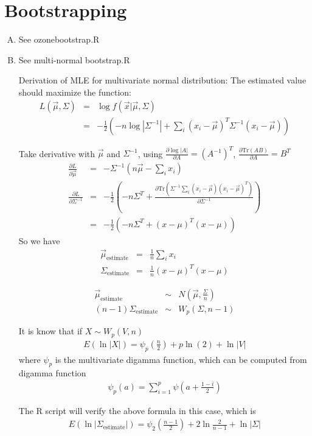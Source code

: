 \documentclass{article}
\begin{document}
\section{Bootstrapping}
\begin{enumerate}[(A)]
\item
See ozonebootstrap.R

\item
See multi-normal bootstrap.R

Derivation of MLE for multivariate normal distribution: The estimated value should maximize the function:
\begin{eqnarray}
L(\vec{\mu},\Sigma)&=&\log f(\vec{x}|\vec{\mu},\Sigma)\nonumber\\
&=&-\frac{1}{2}(-n\log|\Sigma^{-1}|+\sum_i(x_i-\vec{\mu})^T\Sigma^{-1}(x_i-\vec{\mu}))
\end{eqnarray}

Take derivative with $\vec{\mu}$ and $\Sigma^{-1}$, using $\frac{\partial\log|A|}{\partial A}=(A^{-1})^T$, $\frac{\partial\textrm{Tr}(AB)}{\partial A}=B^T$
\begin{eqnarray}
\frac{\partial L}{\partial\vec{\mu}}&=&-\Sigma^{-1}(n\vec{\mu}-\sum_ix_i)\\
\frac{\partial L}{\partial\Sigma^{-1}}&=&-\frac{1}{2}(-n\Sigma^T+\frac{\partial\textrm{Tr}(\Sigma^{-1}\sum_i(x_i-\vec{\mu})(x_i-\vec{\mu})^T)}{\partial\Sigma^{-1}})\nonumber\\
&=&-\frac{1}{2}(-n\Sigma^T+(x-\mu)^T(x-\mu))
\end{eqnarray}
So we have
\begin{eqnarray}
\vec{\mu}_{\textrm{estimate}}&=&\frac{1}{n}\sum_ix_i\\
\Sigma_{\textrm{estimate}}&=&\frac{1}{n}(x-\mu)^T(x-\mu)
\end{eqnarray}

\begin{eqnarray}
\vec{\mu}_{\textrm{estimate}}&\sim&N(\vec{\mu},\frac{\Sigma}{n})\\
(n-1)\Sigma_{\textrm{estimate}}&\sim&W_p(\Sigma,n-1)
\end{eqnarray}

It is know that if $X\sim W_p(V,n)$
\begin{eqnarray}
E(\ln|X|)=\psi_p(\frac{n}{2})+p\ln(2)+\ln|V|
\end{eqnarray}
where $\psi_p$ is the multivariate digamma function, which can be computed from digamma function
\begin{eqnarray}
\psi_p(a)=\sum_{i=1}^p\psi(a+\frac{1-i}{2})
\end{eqnarray}

The R script will verify the above formula in this case, which is
\begin{eqnarray}
E(\ln|\Sigma_{\textrm{estimate}}|)=\psi_2(\frac{n-1}{2})+2\ln\frac{2}{n-1}+\ln|\Sigma|
\end{eqnarray}
\end{enumerate}
\end{document}
